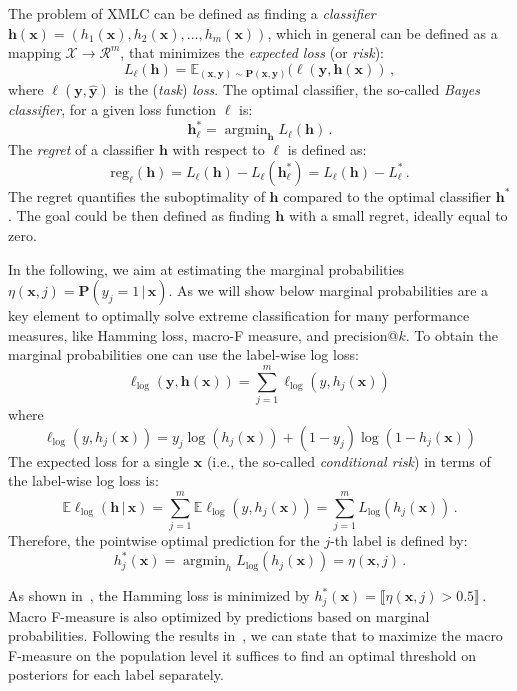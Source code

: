 \documentclass{article}
\renewcommand{\vec}[1]{\boldsymbol{#1}}
\newcommand{\bx}{\vec{x}}
\newcommand{\by}{\vec{y}}
\newcommand{\bh}{\vec{h}}
\newcommand{\calX}{\mathcal{X}}
\newcommand{\calR}{\mathcal{R}}
\newcommand{\prob}{\mathbf{P}}
\newcommand{\reg}{\mathrm{reg}}
\newcommand{\loss}{L}
\newcommand{\assert}[1]{\llbracket #1 \rrbracket}
\newcommand{\given}{\, | \,}
\DeclareMathOperator*{\argmin}{\arg \min}
\begin{document}
{The problem of XMLC can be defined as finding a  \emph{classifier} $\bh(\bx) = (h_1(\bx), h_2(\bx),\ldots, h_m(\bx))$, 
which in general can be defined as a mapping $\calX \rightarrow \calR^m$, that minimizes the \emph{expected loss} (or \emph{risk}):  
$$
\loss_\ell(\bh) = \mathbb{E}_{(\bx,\by) \sim \prob(\bx,\by)} (\ell(\by, \bh(\bx))\,,
$$
where $\ell(\by, \hat{\by})$ is the  (\emph{task}) \emph{loss}.
%
The optimal classifier,  the so-called \emph{Bayes classifier},  for a given loss function $\ell$ is:
$$
\bh^*_\ell = \argmin_{\bh}  \loss_\ell(\bh) \,.
$$
The \emph{regret} of a classifier $\bh$ with respect to $\ell$ is defined as:
 $$
\reg_\ell(\bh) = \loss_\ell(\bh) - \loss_\ell(\bh_{\ell}^*) = \loss_\ell(\bh) - \loss_\ell^* \,.
$$
The regret quantifies the suboptimality of $\bh$ compared to the optimal classifier $\bh^*$. The goal could be then defined as finding $\bh$ with a small regret, ideally equal to zero.

In the following, we aim at estimating the marginal probabilities $\eta(\bx,j) = \prob(y_j = 1 \given \bx)$. As we will show below marginal probabilities are a key element to optimally solve extreme classification for many performance measures, like Hamming loss, macro-F measure, and precision@$k$. 
To obtain the marginal probabilities one can use the label-wise log loss:
$$
\ell_{\log}(\by, \bh(\bx))  = \sum_{j=1}^m \ell_{\log}(y, h_j(\bx)) \,
$$
where 
$$
\ell_{\log}(y,h_j(\bx)) = y_j \log(h_j(\bx)) + (1-y_j) \log(1-h_j(\bx)) 
$$
The expected loss for a single $\bx$ (i.e., the so-called \emph{conditional risk}) in terms of the label-wise log loss is:
$$
\mathbb{E} \ell_{\log}(\bh \given \bx) =  \sum_{j=1}^m \mathbb{E}{\ell_{\log}(y, h_j(\bx))} = \sum_{j=1}^m \loss_{\log}(h_j(\bx))\,. %
$$
Therefore, the pointwise optimal prediction for the $j$-th label is defined by:
$$
h_j^*(\bx)  = \argmin_h \loss_{\log}(h_j(\bx)) = \eta(\bx, j) \,.
$$

As shown in~\citep{Dembczynski_et_al_2010c}, the Hamming loss is minimized by 
$
h_j^*(\bx) = \assert{\eta(\bx,j) > 0.5} \,.
$
Macro F-measure is also optimized by predictions based on marginal probabilities. Following the results in~\citep{Ye_et_al_2012,Narasimhan_et_al_2014,Jasinska_et_al_2016, Dembczynski_et_al_2017}, we can state that to maximize the macro F-measure on the population level it suffices to find an optimal threshold on posteriors for each label separately. 

}
\end{document}
